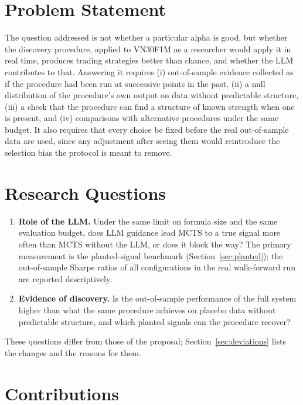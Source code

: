 \documentclass[12pt,a4paper,oneside]{book}
\theoremstyle{definition}
\begin{document}
\section{Problem Statement}

The question addressed is not whether a particular alpha is good, but whether the discovery procedure, applied to VN30F1M as a researcher would apply it in real time, produces trading strategies better than chance, and whether the LLM contributes to that. Answering it requires (i) out-of-sample evidence collected as if the procedure had been run at successive points in the past, (ii) a null distribution of the procedure's own output on data without predictable structure, (iii) a check that the procedure can find a structure of known strength when one is present, and (iv) comparisons with alternative procedures under the same budget. It also requires that every choice be fixed before the real out-of-sample data are used, since any adjustment after seeing them would reintroduce the selection bias the protocol is meant to remove.

\section{Research Questions}
\label{sec:rqs}

\begin{enumerate}
  \item[\textbf{RQ1.}] \textbf{Role of the LLM.} Under the same limit on formula size and the same evaluation budget, does LLM guidance lead MCTS to a true signal more often than MCTS without the LLM, or does it block the way? The primary measurement is the planted-signal benchmark (Section~\ref{sec:planted}); the out-of-sample Sharpe ratios of all configurations in the real walk-forward run are reported descriptively.
  \item[\textbf{RQ2.}] \textbf{Evidence of discovery.} Is the out-of-sample performance of the full system higher than what the same procedure achieves on placebo data without predictable structure, and which planted signals can the procedure recover?
\end{enumerate}

These questions differ from those of the proposal; Section~\ref{sec:deviations} lists the changes and the reasons for them.

\section{Contributions}
\end{document}
